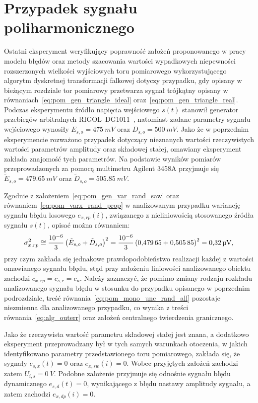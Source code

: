 \section{Przypadek sygnału poliharmonicznego}

Ostatni eksperyment weryfikujący poprawność założeń proponowanego w pracy modelu błędów oraz metody szacowania wartości wypadkowych niepewności rozszerzonych wielkości wyjściowych toru pomiarowego wykorzystującego algorytm dyskretnej transformacji falkowej dotyczy przypadku, gdy opisany w bieżącym rozdziale tor pomiarowy przetwarza sygnał trójkątny opisany w równaniach~\eqref{eq:pom_gen_triangle_ideal} oraz~\eqref{eq:pom_gen_triangle_real}. Podczas eksperymentu źródło napięcia wejściowego $s(t)$ stanowił generator przebiegów arbitralnych RIGOL~DG1011~\cite{rigol_fawg}, natomiast zadane parametry sygnału wejściowego wynosiły $\dot{E}_{s,o} = \qty{475}{mV}$ oraz $\dot{D}_{s,o} = \qty{500}{mV}$. Jako że w poprzednim eksperymencie rozważono przypadek dotyczący nieznanych wartości rzeczywistych wartości parametrów amplitudy oraz składowej stałej, omawiany eksperyment zakłada znajomość tych parametrów. Na podstawie wyników pomiarów przeprowadzonych za pomocą multimetru Agilent 3458A przyjmuje się $\tilde{E}_{s,o} = \qty{479.65}{mV}$ oraz $\tilde{D}_{s,o} = \qty{505.85}{mV}$.

Zgodnie z założeniem~\eqref{eq:pom_gen_var_rand_saw} oraz równaniem~\eqref{eq:pom_varx_rand_prop} w analizowanym przypadku wariancję sygnału błędu losowego $e_{x,rp}(i)$, związanego z nieliniowością stosowanego źródła sygnału $s(t)$, opisać można równaniem:
\begin{equation}
\sigma_{x,rp}^{2} \cong \frac{\num{e-6}}{3} \left(\tilde{E}_{s,o} + \tilde{D}_{s,o}\right)^{2} = \frac{\num{e-6}}{3} \left(\num{0.47965} + \num{0.50585}\right)^{2} = \qty{0.32}{\micro V} \label{eq:pom_multi_rand_var_in},
\end{equation}
przy czym zakłada się jednakowe prawdopodobieństwo realizacji każdej z wartości omawianego sygnału błędu, stąd przy założeniu liniowości analizowanego obiektu zachodzi $c_{x,rp} = c_{s,r} = c_{u}$. Należy zaznaczyć, że pomimo zmiany rodzaju rozkładu analizowanego sygnału błędu w stosunku do przypadku opisanego w poprzednim podrozdziale, treść równania~\eqref{eq:pom_mono_unc_rand_all} pozostaje niezmienna dla analizowanego przypadku, co wynika z treści równania~\eqref{eq:alg_outerr} oraz założeń centralnego twierdzenia granicznego.

Jako że rzeczywista wartość parametru składowej stałej jest znana, a dodatkowo eksperyment przeprowadzany był w tych samych warunkach otoczenia, w jakich identyfikowano parametry przedstawionego toru pomiarowego, zakłada się, że sygnały  $e_{s,x}(t) = 0$ oraz $e_{x,sw}(i) = 0$. Wobec przyjętych założeń zachodzi zatem $U_{i,s} = \qty{0}{V}$. Podobne założenie przyjmuje się odnośnie sygnału błędu dynamicznego $e_{s,d}(t) = 0$, wynikającego z błędu nastawy amplitudy sygnału, a zatem zachodzi $e_{x,dp}(i) = 0$.

